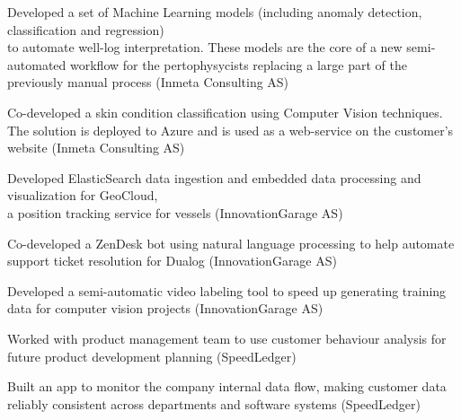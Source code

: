 
  \begin{cvitems}
    \vspace{.5\baselineskip}

    \item\small{Developed a set of Machine Learning models (including anomaly detection, classification and regression) \\
    to automate well-log interpretation. These models are the core of a new semi-automated workflow for the pertophysycists replacing a large part of the previously manual process (Inmeta Consulting AS)}

    \item\small{Co-developed a skin condition classification using Computer Vision techniques. \\
    The solution is deployed to Azure and is used as a web-service on the customer's website (Inmeta Consulting AS)}

    \item\small{Developed ElasticSearch data ingestion and embedded data processing and visualization for GeoCloud, \\
    a position tracking service for vessels (InnovationGarage AS)}


    \item\small{Co-developed a ZenDesk bot using natural language processing
    to help automate support ticket resolution for Dualog (InnovationGarage AS)}
    
    \item\small{Developed a semi-automatic video labeling tool to speed up
    generating training data for computer vision projects (InnovationGarage AS)}

    \item \small{Worked with product management team to use customer behaviour analysis
    for future product development planning (SpeedLedger)}
    
    \item \small{Built an app to monitor the company internal data
      flow, making customer data reliably consistent across
      departments and software systems (SpeedLedger)}


\end{cvitems}
